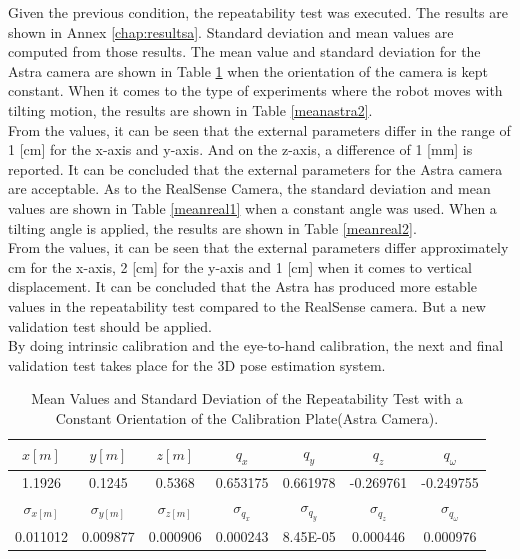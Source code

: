 Given the previous condition, the repeatability test was executed. The results are shown in Annex \ref{chap:resultsa}. Standard deviation and mean values are computed from those results. The mean value and standard deviation for the Astra camera are shown in Table \ref{meanastra1} when the orientation of the camera is kept constant. When it comes to the type of experiments where the robot moves with tilting motion, the results are shown in Table \ref{meanastra2}.\\
From the values, it can be seen that the external parameters differ in the range of 1 [cm] for the x-axis and y-axis. And on the z-axis, a difference of 1 [mm] is reported. It can be concluded that the external parameters for the Astra camera are acceptable.
As to the RealSense Camera, the standard deviation and mean values are shown in Table \ref{meanreal1} when a constant angle was used. When a tilting angle is applied, the results are shown in Table \ref{meanreal2}.\\
From the values, it can be seen that the external parameters differ approximately \unit[1]{cm} for the x-axis, 2 [cm] for the y-axis and 1 [cm]  when it comes to vertical displacement.  It can be concluded that the Astra has produced more estable values in the repeatability test compared to the RealSense camera. But a new validation test should be applied. \\
By doing intrinsic calibration and the eye-to-hand calibration, the next and final validation test takes place for the 3D pose estimation system.


\begin{table}[ht]
\renewcommand{\arraystretch}{1.3}
\caption{Mean Values and Standard Deviation of the Repeatability Test with a Constant Orientation of the Calibration Plate(Astra Camera).}
\label{meanastra1}
\centering
\begin{tabular}{|c|c|c|c|c|c|c|}
\hline
$x[m]$ & $y[m]$ & $z[m]$ & $q_{x}$ & $q_{y}$ & $q_{z}$ &$q_{\omega}$ \\
\hline
1.1926 & 0.1245 & 0.5368& 0.653175&	0.661978&	-0.269761&	-0.249755 \\
\hline
\hline
$\sigma_{x[m]}$ & $\sigma_{y[m]}$ & $\sigma_{z[m]}$ & $\sigma_{q_{x}}$ & $\sigma_{q_{y}}$ & $\sigma_{q_{z}}$ &$\sigma_{q_{\omega}}$ \\
\hline
0.011012&	0.009877	&0.000906&0.000243&	8.45E-05&	0.000446&	0.000976\\
\hline
\end{tabular}
\end{table}


